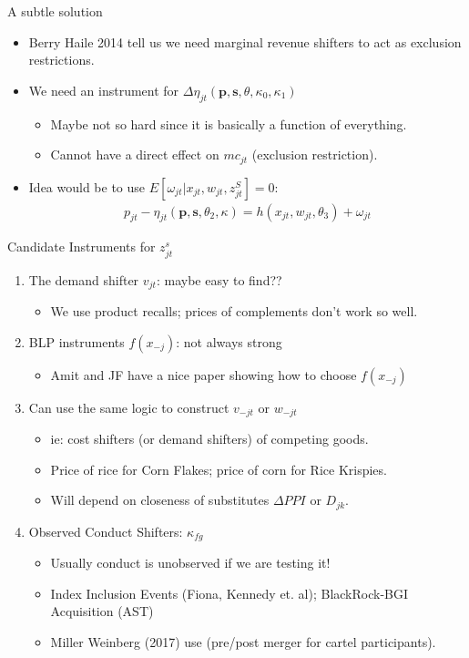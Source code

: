 \documentclass[xcolor=pdftex,dvipsnames,table,mathserif,aspectratio=169]{beamer}
\begin{document}
\begin{frame}{A subtle solution}
\begin{itemize}
\item Berry Haile 2014 tell us we need \alert{marginal revenue shifters} to act as \alert{exclusion restrictions}.
\item We need an instrument for $\Delta \eta_{jt}(\mathbf{p},\mathbf{s},\theta,\kappa_0,\kappa_1)$
\begin{itemize}
\item Maybe not so hard since it is basically a function of everything.
\item Cannot have a direct effect on $mc_{jt}$ (exclusion restriction).
\end{itemize}
\item Idea would be to use $E[\omega_{jt} | x_{jt}, w_{jt}, z_{jt}^S]=0$:
\begin{align*}
 p_{jt} - \eta_{jt}(\mathbf{p},\mathbf{s},\theta_2,\kappa)  =  h(x_{jt}, w_{jt},\theta_3)  + \omega_{jt} 
\end{align*}
\end{itemize}
\end{frame}

\begin{frame}{Candidate Instruments for $z_{jt}^s$}
\begin{enumerate}
\item The demand shifter $v_{jt}$: maybe easy to find??
\begin{itemize}
\item We use product recalls; prices of complements don't work so well.
\end{itemize}
\item BLP instruments $f(x_{-j})$: not always strong
\begin{itemize}
\item Amit and JF have a nice paper showing how to choose $f(x_{-j})$
\end{itemize}
\item Can use the same logic to construct $v_{-jt}$ or $w_{-jt}$
\begin{itemize}
\item ie: cost shifters (or demand shifters) of competing goods.
\item Price of rice for Corn Flakes; price of corn for Rice Krispies.
\item Will depend on closeness of substitutes $\Delta PPI$ or $D_{jk}$.
\end{itemize}
\item Observed Conduct Shifters: $\kappa_{fg}$
\begin{itemize}
\item Usually conduct is \alert{unobserved} if we are testing it!
\item Index Inclusion Events (Fiona, Kennedy et. al); BlackRock-BGI Acquisition (AST)
\item Miller Weinberg (2017) use (pre/post merger for cartel participants).
\end{itemize}
\end{enumerate}
\end{frame}
\end{document}
